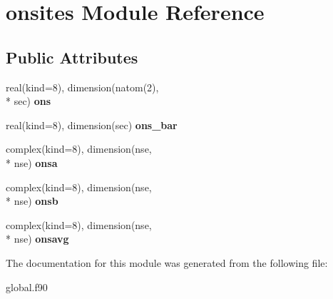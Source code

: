 \hypertarget{classonsites}{\section{onsites Module Reference}
\label{classonsites}
}
\subsection*{Public Attributes}
\begin{DoxyCompactItemize}
\item 
\hypertarget{classonsites_af389c6933a4986c04420557370431ee5}{real(kind=8), dimension(natom(2), \\*
sec) {\bfseries ons}}\label{classonsites_af389c6933a4986c04420557370431ee5}

\item 
\hypertarget{classonsites_a65f7fd5bb4803a760da6474c9119a7bb}{real(kind=8), dimension(sec) {\bfseries ons\-\_\-bar}}\label{classonsites_a65f7fd5bb4803a760da6474c9119a7bb}

\item 
\hypertarget{classonsites_a57da6b749a72b72ccc0d0f18549e9647}{complex(kind=8), dimension(nse, \\*
nse) {\bfseries onsa}}\label{classonsites_a57da6b749a72b72ccc0d0f18549e9647}

\item 
\hypertarget{classonsites_a05b10240325d641ee5015dd622e69ecd}{complex(kind=8), dimension(nse, \\*
nse) {\bfseries onsb}}\label{classonsites_a05b10240325d641ee5015dd622e69ecd}

\item 
\hypertarget{classonsites_a404c9ef0071641b33f57c9f83bb6fec3}{complex(kind=8), dimension(nse, \\*
nse) {\bfseries onsavg}}\label{classonsites_a404c9ef0071641b33f57c9f83bb6fec3}

\end{DoxyCompactItemize}


The documentation for this module was generated from the following file\-:\begin{DoxyCompactItemize}
\item 
global.\-f90\end{DoxyCompactItemize}
